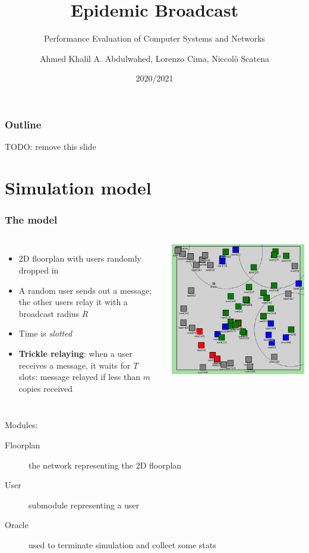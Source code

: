\documentclass[aspectratio=169]{beamer}
\title{Epidemic Broadcast}
\subtitle{Performance Evaluation of Computer Systems and Networks}
\author[Abdulwahed, Cima, Scatena]{Ahmed Khalil A. Abdulwahed, Lorenzo Cima, Niccolò Scatena}
\institute[UNIPI]{University of Pisa}
\date{2020/2021}
\begin{document}
\begin{frame}
	\titlepage{}
\end{frame}

\begin{frame}
	\frametitle{Outline}
	\tableofcontents
	TODO\@: remove this slide
\end{frame}

\section{Simulation model}

\begin{frame}
	\frametitle{The model}
	\begin{columns}
		\begin{itemize}
			\item 2D floorplan with users randomly dropped in
			\item A random user sends out a message; the other users
				relay it with a broadcast radius \emph{R}
			\item Time is \emph{slotted}
			\item \textbf{Trickle relaying}: when a user receives a
				message, it waits for \(T\) slots: message
				relayed if less than \(m\) copies received
		\end{itemize}
		\includegraphics[width=\textwidth]{img/snapshot}
	\end{columns}
	Modules:
	\begin{description}
		\item[Floorplan] the network representing the 2D
			floorplan
		\item[User] submodule representing a user
		\item[Oracle] used to terminate simulation and collect
			some stats
	\end{description}
\end{frame}
\end{document}
